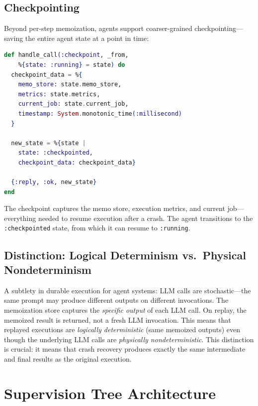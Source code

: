 \documentclass[12pt,a4paper]{article}
\theoremstyle{definition}
\theoremstyle{remark}
\begin{document}
\subsection{Checkpointing}

Beyond per-step memoization, agents support coarser-grained checkpointing---saving the entire agent state at a point in time:

\begin{lstlisting}[language=elixir, caption={Checkpoint creation (from \texttt{agent.ex})}, label={lst:checkpoint}]
def handle_call(:checkpoint, _from,
    %{state: :running} = state) do
  checkpoint_data = %{
    memo_store: state.memo_store,
    metrics: state.metrics,
    current_job: state.current_job,
    timestamp: System.monotonic_time(:millisecond)
  }

  new_state = %{state |
    state: :checkpointed,
    checkpoint_data: checkpoint_data}

  {:reply, :ok, new_state}
end
\end{lstlisting}

The checkpoint captures the memo store, execution metrics, and current job---everything needed to resume execution after a crash. The agent transitions to the \texttt{:checkpointed} state, from which it can resume to \texttt{:running}.

\subsection{Distinction: Logical Determinism vs.\ Physical Nondeterminism}

A subtlety in durable execution for agent systems: LLM calls are stochastic---the same prompt may produce different outputs on different invocations. The memoization store captures the \emph{specific output} of each LLM call. On replay, the memoized result is returned, not a fresh LLM invocation. This means that replayed executions are \emph{logically deterministic} (same memoized outputs) even though the underlying LLM calls are \emph{physically nondeterministic}. This distinction is crucial: it means that crash recovery produces exactly the same intermediate and final results as the original execution.

\section{Supervision Tree Architecture}\label{sec:implementation}
\end{document}
